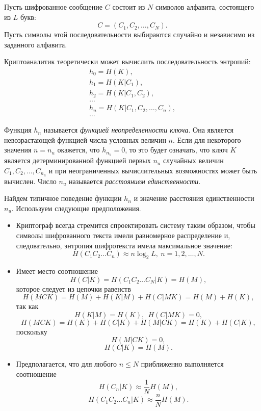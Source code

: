 Пусть шифрованное сообщение $C$ состоит из $N$ символов алфавита, состоящего из $L$ букв:
\[
    C = (C_1, C_2, \dots, C_N).
\]
Пусть символы этой последовательности выбираются случайно и независимо из заданного алфавита.

Криптоаналитик теоретически может вычислить последовательность энтропий:
\[ \begin{array}{l}
    h_0 = H(K), \\
    h_1 = H(K | C_1), \\
    h_2 = H(K | C_1, C_2), \\
    \dots \\
    h_n = H(K | C_1, C_2, \dots, C_n), \\
    \dots
\end{array} \]

Функция $h_n$ называется \emph{функцией неопределенности ключа}. Она является невозрастающей функцией числа условных величин $n$. Если для некоторого значения $n = n_u$ окажется, что $h_{n_u} = 0$, то это будет означать, что ключ $K$ является детерминированной функцией первых $n_u$ случайных величин $C_1, C_2, \dots, C_{n_u}$ и при неограниченных вычислительных возможностях может быть вычислен. Число $n_u$ называется \emph{расстоянием единственности}.

Найдем типичное поведение функции $h_n$ и значение расстояния единственности $n_u$. Используем следующие предположения.
\begin{itemize}
    \item Криптограф всегда стремится спроектировать систему таким образом, чтобы символы шифрованного текста имели равномерное распределение и, следовательно, энтропия шифротекста имела максимальное значение:
            \[ H(C_1 C_2 \dots C_n) \approx n \log_2 L, ~ n = 1, 2, \dots, N. \]
    \item Имеет место соотношение
            \[ H(C | K) = H(C_1 C_2 \dots C_N | K)  =  H(M), \]
        которое следует из цепочки равенств
            \[ H(MCK) = H(M) + H(K | M) + H(C | MK) = H(M) + H(K), \]
        так как
            \[ H(K | M) = H(K), ~~ H(C | MK) = 0, \]
            \[H(MCK) = H(K) + H(C | K) + H(M | CK) = H(K) + H(C | K), \]
        поскольку
            \[ H(M | CK) = 0, \]
            \[ H(C | K) =  H(M). \]
    \item Предполагается, что для любого $n \le N$ приближенно выполняется соотношение
        \[ H(C_n | K) \approx \frac{1}{N} H(M), \]
        \[ H(C_1 C_2\dots C_n | K) \approx \frac{n}{N} H(M). \]
\end{itemize}

